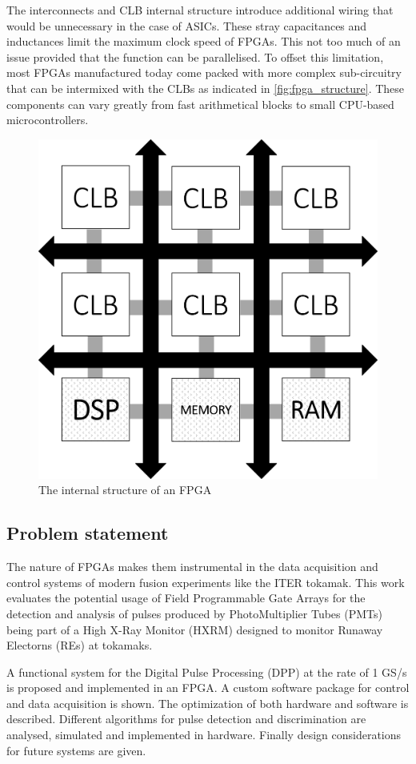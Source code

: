     The interconnects and CLB internal structure introduce additional wiring
    that would be unnecessary in the case of ASICs. These stray capacitances 
    and inductances limit the maximum clock speed of FPGAs. This not too much
    of an issue provided that the function can be parallelised. To offset 
    this limitation, most FPGAs manufactured today come packed with 
    more complex sub-circuitry that can be intermixed with the CLBs
    as indicated in \autoref{fig:fpga_structure}.
    These components can vary greatly from fast arithmetical blocks
    to small CPU-based microcontrollers.

    \begin{figure}[H]
      \centering
      \includegraphics[width=.6\linewidth]{media/fpga_structure.png}
      \caption{The internal structure of an FPGA}
      \label{fig:fpga_structure}
    \end{figure}
    

\subsection{Problem statement}

The nature of FPGAs makes them instrumental in the data acquisition 
and control systems of modern fusion experiments like the ITER tokamak.
This work evaluates the potential usage of Field Programmable Gate Arrays
for the detection and analysis of pulses produced by PhotoMultiplier Tubes (PMTs)
being part of a High X-Ray Monitor (HXRM) designed to monitor Runaway Electorns
(REs) at tokamaks.


A functional system for the Digital Pulse Processing (DPP) at the rate of 
1 GS/s is proposed and implemented in an FPGA. A custom
software package for control and data acquisition is shown.
The optimization of both hardware and software is described.
Different algorithms for pulse detection and discrimination
are analysed, simulated and implemented in hardware. Finally design
considerations for future systems are given.

